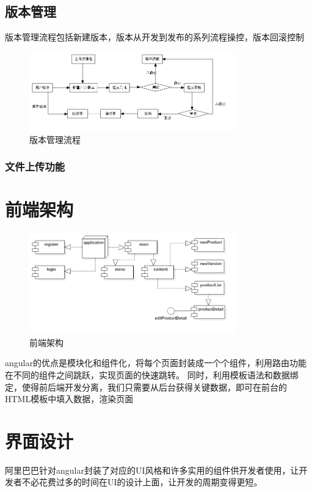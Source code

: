 \subsection{版本管理}
\label{sec:version}
版本管理流程包括新建版本，版本从开发到发布的系列流程操控，版本回滚控制
\begin{figure}[h]
	\centering
	\includegraphics[width=0.8\textwidth]{image/UML/FlowchartDiagram.png}
	\caption{版本管理流程}
	\label{fig:version}
\end{figure}
\subsubsection{文件上传功能}
\label{sec:fileUpload}
\section{前端架构}
\label{sec:Front-end_architecture}
\begin{figure}[h]
	\centering
	\includegraphics[width=0.8\textwidth]{image/UML/ComponentDiagram.png}
	\caption{前端架构}
	\label{fig:frame}
\end{figure}
angular的优点是模块化和组件化，将每个页面封装成一个个组件，利用路由功能在不同的组件之间跳跃，实现页面的快速跳转。
同时，利用模板语法和数据绑定，使得前后端开发分离，我们只需要从后台获得关键数据，即可在前台的HTML模板中填入数据，渲染页面	
\section{界面设计}
\label{sec:UI}
阿里巴巴针对angular封装了对应的UI风格和许多实用的组件供开发者使用，让开发者不必花费过多的时间在UI的设计上面，让开发的周期变得更短。

